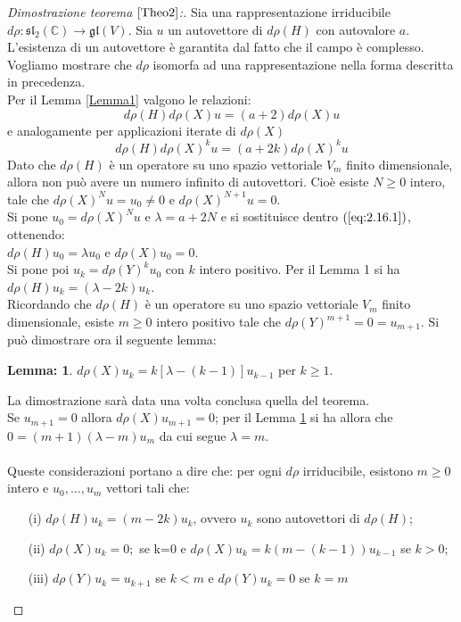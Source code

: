 \documentclass[12pt,a4paper]{report}
\theoremstyle{definition}
\theoremstyle{definition}
\theoremstyle{definition}
\newtheorem{Lem}[Def]{Lemma:}
\theoremstyle{definition}
\begin{document}
\begin{proof}[Dimostrazione teorema $\ref{Theo2}$:]
	Sia una rappresentazione irriducibile $d\rho:\mathfrak{sl_2(\mathbb{C})}\rightarrow \mathfrak{gl}(V)$. Sia $u$ un autovettore di $d\rho(H)$ con autovalore $a$. L'esistenza di un autovettore è garantita dal fatto che il campo è complesso. Vogliamo mostrare che $d\rho$ isomorfa ad una rappresentazione nella forma descritta in precedenza.\\
	Per il Lemma \ref{Lemma1} valgono le relazioni: $$d\rho(H)d\rho(X)u=(a+2)d\rho(X)u$$ e analogamente per applicazioni iterate di $d\rho(X)$
	\begin{equation}
		\label{eq:2.16.1}
		d\rho(H)d\rho(X)^ku=(a+2k)d\rho(X)^ku
		\tag{1}
	\end{equation}
	Dato che $d\rho(H)$ è un operatore su uno spazio vettoriale $V_m$ finito dimensionale, allora non può avere un numero infinito di autovettori. Cioè esiste $N\geq 0$ intero, tale che $d\rho(X)^Nu=u_0\neq0$ e $d\rho(X)^{N+1}u=0$.\\
	Si pone $u_0=d\rho(X)^Nu$ e $\lambda=a+2N$ e si sostituisce dentro $(\ref{eq:2.16.1})$, ottenendo:\\  $d\rho(H)u_0=\lambda u_0$ e $d\rho(X)u_0=0$.	\\
	Si pone poi $u_k=d\rho(Y)^ku_0$ con $k$ intero positivo. Per il Lemma 1 si ha $d\rho(H)u_k=(\lambda-2k)u_k$.\\
	Ricordando che $d\rho(H)$ è un operatore su uno spazio vettoriale $V_m$ finito dimensionale, esiste $m\geq0$ intero positivo tale che  $d\rho(Y)^{m+1}=0=u_{m+1}$. Si può dimostrare ora il seguente lemma:
	\begin{Lem}\label{Lemma2}
		$d\rho(X)u_k=k[\lambda-(k-1)]u_{k-1}$ per $k\geq 1$.
	\end{Lem} 
La dimostrazione sarà data una volta conclusa quella del teorema.
\\Se $u_{m+1}=0$ allora $d\rho(X)u_{m+1}=0$; per il Lemma \ref{Lemma2} si ha allora che $0=(m+1)(\lambda-m)u_m$ da cui segue $\lambda=m$.\\
\\
	Queste considerazioni portano a dire che: per ogni $d\rho $ irriducibile, esistono $m\geq0$ intero e $u_0,...,u_m$ vettori tali che:\begin{itemize}
		\item[(i)] $d\rho(H)u_k=(m-2k)u_k$, ovvero $u_k$ sono autovettori di $d\rho(H)$;
		\item[(ii)] $d\rho(X)u_k=0;$ se k=0 e $d\rho(X)u_k=k(m-(k-1))u_{k-1}$ se $k>0$;
		\item[(iii)] $d\rho(Y)u_k=u_{k+1}$ se $k<m$ e $d\rho(Y)u_k=0$ se $k=m$

\end{itemize}
\end{proof}
\end{document}
